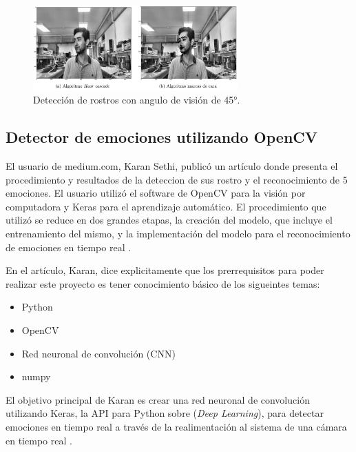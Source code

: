 \begin{figure}[h]
    \centering
    \includegraphics[width=0.7\textwidth]{figuras/Ruano_Result.png}
    \caption{Detección de rostros con angulo de visión de 45°. \cite{Ruano2019Tesis}}
    \label{fig:RuanoResult}
\end{figure}

\subsection*{Detector de emociones utilizando OpenCV}
El usuario de medium.com, Karan  Sethi, publicó un artículo donde presenta el procedimiento y resultados de la deteccion de sus rostro y el reconocimiento de 5 emociones. El usuario utilizó el software de OpenCV para la visión por computadora y Keras para el aprendizaje automático. El procedimiento que utilizó se reduce en dos grandes etapas, la creación del modelo, que incluye el entrenamiento del mismo, y la implementación del modelo para el reconocimiento de emociones en tiempo real \cite{Karan}.

En el artículo, Karan, dice explicitamente que los prerrequisitos para poder realizar este proyecto es tener conocimiento básico de los sigueintes temas:
\begin{itemize}
\item Python
\item OpenCV
\item Red neuronal de convolución (CNN)
\item numpy
\end{itemize}

El objetivo principal de Karan es crear una red neuronal de convolución utilizando Keras, la API para Python sobre (\textit{Deep Learning}), para detectar emociones en tiempo real a través de la realimentación al sistema de una cámara en tiempo real \cite{Karan}.

